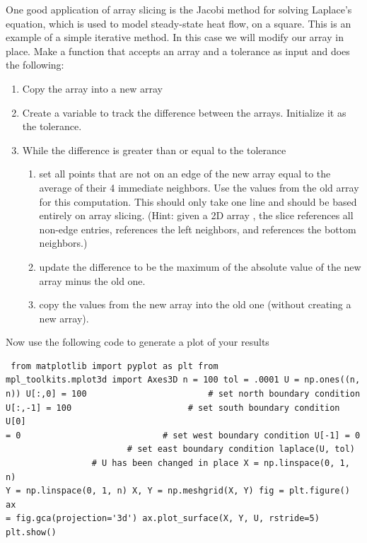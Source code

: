 \begin{problem} One good application of array slicing is the Jacobi
method for solving Laplace's equation, which is used to model
steady-state heat flow, on a square. This is an example of a simple
iterative method. In this case we will modify our array in place. Make a
function that accepts an array and a tolerance as input and does the
following: \begin{enumerate} \item Copy the array into a new array \item
Create a variable to track the difference between the arrays. Initialize
it as the tolerance. \item While the difference is greater than or equal
to the tolerance \begin{enumerate} \item set all points that are not on
an edge of the new array equal to the average of their 4 immediate
neighbors. Use the values from the old array for this computation. This
should only take one line and should be based entirely on array slicing.
(Hint: given a 2D array , the slice  references
all non-edge entries,  references the left neighbors,
and  references the bottom neighbors.) \item update the
difference to be the maximum of the absolute value of the new array
minus the old one. \item copy the values from the new array into the old
one (without creating a new array). \end{enumerate} \end{enumerate}

Now use the following code to generate a plot of your results
\begin{lstlisting} from matplotlib import pyplot as plt from
mpl_toolkits.mplot3d import Axes3D n = 100 tol = .0001 U = np.ones((n,
n)) U[:,0] = 100                        # set north boundary condition
U[:,-1] = 100                       # set south boundary condition U[0]
= 0                            # set west boundary condition U[-1] = 0  
                        # set east boundary condition laplace(U, tol)   
                 # U has been changed in place X = np.linspace(0, 1, n)
Y = np.linspace(0, 1, n) X, Y = np.meshgrid(X, Y) fig = plt.figure() ax
= fig.gca(projection='3d') ax.plot_surface(X, Y, U, rstride=5)
plt.show() \end{lstlisting}


\end{problem}

